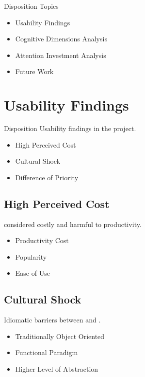 \begin{frame}{\secname}{Disposition}
	Topics
	\begin{itemize}
		\item Usability Findings
		\item Cognitive Dimensions Analysis
		\item Attention Investment Analysis
		\item Future Work
	\end{itemize}
\end{frame}

\section{Usability Findings}
\begin{frame}{\secname}{Disposition}
	Usability findings in the project.
	\begin{itemize}
		\item<2-> High Perceived Cost
		\item<3-> Cultural Shock
		\item<4-> Difference of Priority
	\end{itemize}
\end{frame}

\subsection{High Perceived Cost}
\begin{frame}{\secname}{\subsecname}
	\fs considered costly and harmful to productivity.
	\begin{itemize}
		\item<2-> Productivity Cost
		\item<3-> Popularity
		\item<4-> Ease of Use
	\end{itemize}
\end{frame}

\subsection{Cultural Shock}
\begin{frame}{\secname}{\subsecname}
	Idiomatic barriers between \cs and \fs.
	\begin{itemize}
		\item<2-> Traditionally Object Oriented
		\item<3-> Functional Paradigm
		\item<4-> Higher Level of Abstraction
	\end{itemize}
\end{frame}

